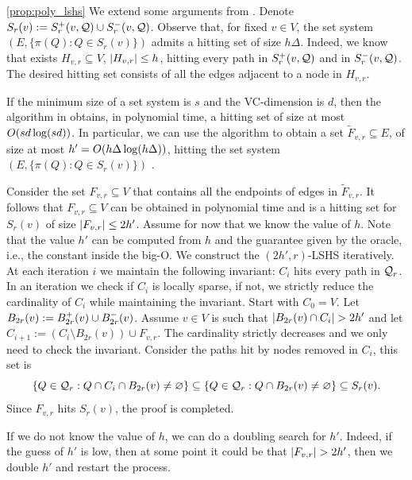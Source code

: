 \documentclass[opre,nonblindrev]{informs3} %
\begin{document}
\begin{APPENDICES}
\begin{proofof}{\cref{prop:poly_lshs}}
We extend some arguments from \cite[Theorem 8.2]{highway2013}.
Denote $S_r(v):=S^+_r(v,\mathcal{Q})\cup S^-_r(v,\mathcal{Q})$. 
Observe that, for fixed $v\in V$, the set system $(E,\{\pi(Q):Q \in S_r(v)\})$ admits a hitting set of size $h\Delta$.
Indeed, we know that exists $H_{v,r}\subseteq V$, $\lvert H_{v,r}\rvert\leq h$, hitting every path in $S^+_r(v,\mathcal{Q})$ and in $S^-_r(v,\mathcal{Q})$.
The desired hitting set consists of all the edges adjacent to a node in $H_{v,r}$.

If the minimum size of a set system is $s$ and the VC-dimension is $d$, then the algorithm in \cite{vc_dim_hitting} obtains, in polynomial time, a hitting set of size at most $O(sd\log(sd))$.
In particular, we can use the algorithm to obtain a set $\tilde F_{v,r}\subseteq E$, of size at most $h'=O(h\Delta\log(h\Delta))$, hitting the set system $(E,\{\pi(Q):Q \in S_r(v)\})$ .

Consider the set $F_{v,r}\subseteq V$ that contains all the endpoints of edges in $\tilde F_{v,r}$.
It follows that $F_{v,r}\subseteq V$ can be obtained in polynomial time and is a hitting set for $S_r(v)$ of size $\lvert F_{v,r}\rvert\leq 2h'$.
Assume for now that we know the value of $h$.
Note that the value $h'$ can be computed from $h$ and the guarantee given by the oracle, i.e., the constant inside the big-O.
We construct the $(2h',r)$-LSHS iteratively.
At each iteration $i$ we maintain the following invariant: $C_i$ hits every path in $\mathcal{Q}_r$.
In an iteration we check if $C_i$ is locally sparse, if not, we strictly reduce the cardinality of $C_i$ while maintaining the invariant.
Start with $C_0=V$. 
Let $B_{2r}(v):=B^+_{2r}(v)\cup B^-_{2r}(v)$.
Assume $v\in V$ is such that $\lvert B_{2r}(v)\cap C_i\rvert>2h'$ and let $C_{i+1}:=(C_i\setminus B_{2r}(v))\cup F_{v,r} $.
The cardinality strictly decreases and we only need to check the invariant.
Consider the paths hit by nodes removed in $C_i$, this set is
\[
\{Q\in\mathcal{Q}_r: Q\cap C_i\cap B_{2r}(v)\neq \varnothing\}
\subseteq \{Q\in\mathcal{Q}_r: Q\cap B_{2r}(v)\neq \varnothing\} 
\subseteq S_r(v).
\]
Since $F_{v,r}$ hits $S_r(v)$, the proof is completed.

If we do not know the value of $h$, we can do a doubling search for $h'$. 
Indeed, if the guess of $h'$ is low, then at some point it could be that $\lvert F_{v,r}\rvert>2h'$, then we double $h'$ and restart the process.
\end{proofof}



\end{APPENDICES}
\end{document}
